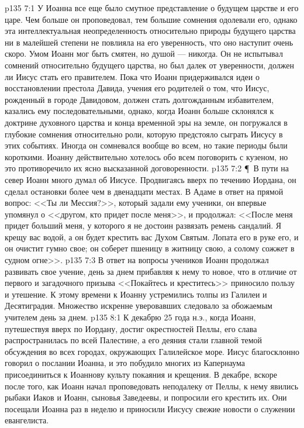 \vs p135 7:1 У Иоанна все еще было смутное представление о будущем царстве и его царе. Чем больше он проповедовал, тем большие сомнения одолевали его, однако эта интеллектуальная неопределенность относительно природы будущего царства ни в малейшей степени не повлияла на его уверенность, что оно наступит очень скоро. Умом Иоанн мог быть смятен, но душой --- никогда. Он не испытывал сомнений относительно будущего царства, но был далек от уверенности, должен ли Иисус стать его правителем. Пока что Иоанн придерживался идеи о восстановлении престола Давида, учения его родителей о том, что Иисус, рожденный в городе Давидовом, должен стать долгожданным избавителем, казались ему последовательными, однако, когда Иоанн больше склонялся к доктрине духовного царства и конца временной эры на земле, он погружался в глубокие сомнения относительно роли, которую предстояло сыграть Иисусу в этих событиях. Иногда он сомневался вообще во всем, но такие периоды были короткими. Иоанну действительно хотелось обо всем поговорить с кузеном, но это противоречило их ясно высказанной договоренности.
\vs p135 7:2 \P\ В пути на север Иоанн много думал об Иисусе. Продвигаясь вверх по течению Иордана, он сделал остановки более чем в двенадцати местах. В Адаме в ответ на прямой вопрос: <<Ты ли Мессия?>>, который задали ему ученики, он впервые упомянул о <<другом, кто придет после меня>>, и продолжал: <<После меня придет больший меня, у которого я не достоин развязать ремень сандалий. Я крещу вас водой, а он будет крестить вас Духом Святым. Лопата его в руке его, и он очистит гумно свое; он соберет пшеницу в житницу свою, а солому сожжет в судном огне>>.
\vs p135 7:3 В ответ на вопросы учеников Иоанн продолжал развивать свое учение, день за днем прибавляя к нему то новое, что в отличие от первого и загадочного призыва <<Покайтесь и креститесь>> приносило пользу и утешение. К этому времени к Иоанну устремились толпы из Галилеи и Десятиградия. Множество искренне уверовавших следовало за обожаемым учителем день за днем.
\vs p135 8:1 К декабрю 25 года н.э., когда Иоанн, путешествуя вверх по Иордану, достиг окрестностей Пеллы, его слава распространилась по всей Палестине, а его деяния стали главной темой обсуждения во всех городах, окружающих Галилейское море. Иисус благосклонно говорил о послании Иоанна, и это побудило многих из Капернаума присоединиться к Иоаннову культу покаяния и крещения. В декабре, вскоре после того, как Иоанн начал проповедовать неподалеку от Пеллы, к нему явились рыбаки Иаков и Иоанн, сыновья Заведеевы, и попросили его крестить их. Они посещали Иоанна раз в неделю и приносили Иисусу свежие новости о служении евангелиста.
